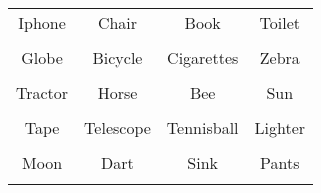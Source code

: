 \documentclass[12pt,a4paper]{article}
\begin{document}
\thispagestyle{empty}
\begin{table}[]
\centering
\Huge
\begin{tabular}{cccc}
 Iphone& Chair& Book& Toilet\\  & & & \\
 Globe& Bicycle& Cigarettes& Zebra\\  & & & \\
 Tractor& Horse& Bee& Sun\\  & & & \\
 Tape& Telescope& Tennisball& Lighter\\  & & & \\
 Moon& Dart& Sink& Pants\\  & & & \\
\end{tabular}
\end{table}
\end{document}
